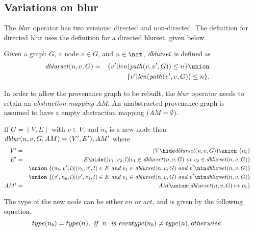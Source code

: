 \documentclass{elsarticle}
\begin{document}
\subsection{Variations on blur}


The $\mathit{blur}$ operator has two versions: directed and non-directed. The definition for directed blur uses the definition for a directed blurset, given below.

\begin{definition} \label{def:directed-blurset}
  Given a graph $G$, a node $v\in G$, and $n \in \nat$, $\mathit{dblurset}$ is defined as
  \begin{eqnarray*}
    \dblurset(n,v,G) & = & \{v'|\len(\Path(v,v',G)) \leq n\}\union \\
                     &   & \{v'|\len(\Path(v',v,G)) \leq n\}.
  \end{eqnarray*}
\end{definition}

In order to allow the provenance graph to be rebuilt, the $blur$ operator needs to retain an \emph{abstraction mapping} $AM$. An unabstracted provenance graph is assumed to have a empty abstraction mapping ($AM=\emptyset$). 

\begin{definition} \label{def:directed-blur}
  If $G = (V,E)$ with $v \in V$, and $n_b$ is a new node then $\mathit{dblur}(n,v,G,AM) = (V',E'),AM'$ where
  \begin{eqnarray*}
  V' &=& (V\hide \dblurset(n,v,G)) \union\ \{n_b\}\\
  E' &=& E\hide \{(v_1,v_2,l)| v_1 \in \dblurset(n,v,G) ~\emph{or}~ v_2 \in \dblurset(n,v,G)\}\\
  &&\union\ \{(n_b,v',l)|(v_1,v',l) \in E ~\emph{and}~ v_1 \in \dblurset(n,v,G) ~\emph{and}~ v' \nin \dblurset(n,v,G) \}\\
  &&\union\ \{(v',n_b,l)|(v',v_1,l) \in E ~\emph{and}~ v_1 \in \dblurset(n,v,G)  ~\emph{and}~ v' \nin \dblurset(n,v,G) \} \\
  AM' & = & AM \union \{dblurset(n,v,G) \mapsto n_b\}\\  
  \end{eqnarray*}
\end{definition}

The type of the new node can be either $en$ or $act$, and is given by the following equation. 
\[
type(n_b) = type(n), ~\emph{if}~~ n~~ \emph{is  even}\\
type(n_b) \ne type(n), otherwise.
\]
\end{document}
